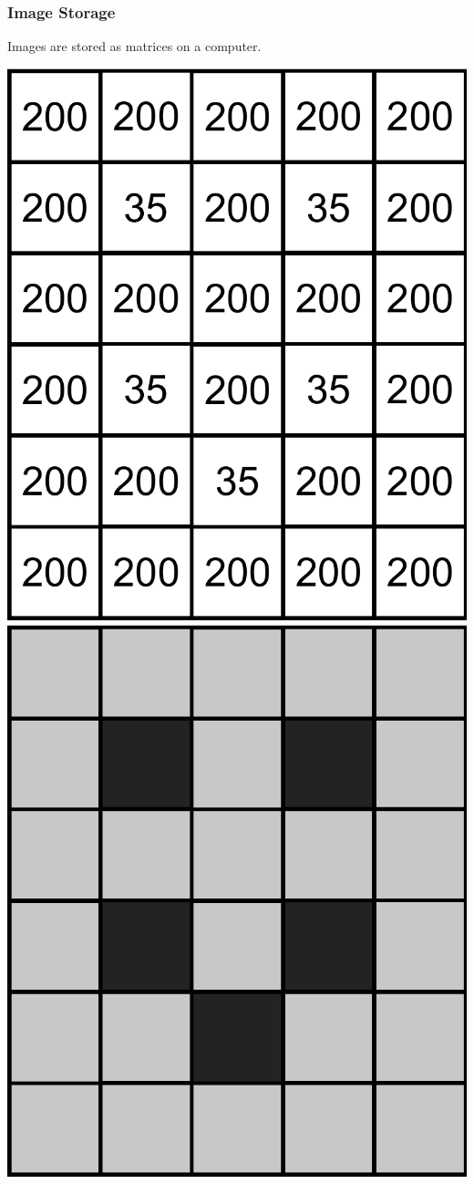 \begin{frame}
    \frametitle{Image Storage}

    Images are stored as matrices on a computer.

    \begin{center}
        \includegraphics[height=.55\textheight ]{img/Smile1} \quad
        \includegraphics[height=.55\textheight ]{img/Smile2}

\end{center}
\end{frame}

